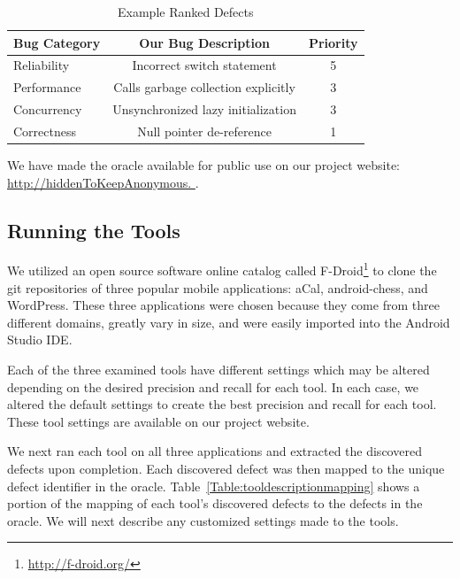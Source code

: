 \documentclass{sig-alternate}
\makeatletter
\newif\ifisnopii
\newcommand{\specialcell}[2][c]{%
  \begin{tabular}[#1]{@{}l@{}}#2\end{tabular}}
\makeatother
\begin{document}
\begin{table}[h!]
\begin{center}
\caption{Example Ranked Defects}
\label{Table:rankeddefects}
  \begin{tabular}{ | l | c | c | } \hline

     \bfseries Bug Category & \bfseries Our Bug Description & \bfseries Priority  \\  \hline

          Reliability & Incorrect switch statement & 5  \\ \hline
          Performance & Calls garbage collection explicitly & 3  \\ \hline
          Concurrency & Unsynchronized lazy initialization & 3  \\ \hline
          Correctness & Null pointer de-reference & 1  \\ \hline

  \end{tabular}
  \end{center}
\end{table}

We have made the oracle available for public use on our project website: \ifisnopii \url{http://darwin.rit.edu/caa/} \else \url{http://hiddenToKeepAnonymous. } \fi.


\subsection{Running the Tools}
We utilized an open source software online catalog called F-Droid\footnote{\url{http://f-droid.org/}} to clone the git repositories of three popular mobile applications: aCal, android-chess, and WordPress. These three applications were chosen because they come from three different domains, greatly vary in size, and were easily imported into the Android Studio IDE.

Each of the three examined tools have different settings which may be altered depending on the desired precision and recall for each tool. In each case, we altered the default settings to create the best precision and recall for each tool. These tool settings are available on our project website.

We next ran each tool on all three applications and extracted the discovered defects upon completion. Each discovered defect was then mapped to the unique defect identifier in the oracle. Table~\ref{Table:tooldescriptionmapping} shows a portion of the mapping of each tool's discovered defects to the defects in the oracle. We will next describe any customized settings made to the tools.\\
\end{document}

